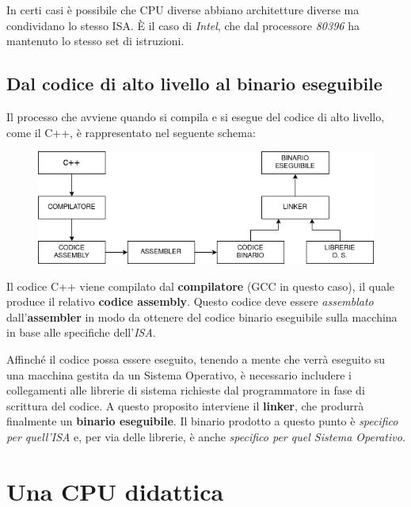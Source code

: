 \documentclass[a4paper,11pt,oneside]{book}
\begin{document}
In certi casi è possibile che CPU diverse abbiano architetture diverse ma condividano lo stesso ISA. È il caso di \emph{Intel}, che dal processore \emph{80396} ha mantenuto
lo stesso set di istruzioni.

\newpage
\subsection{Dal codice di alto livello al binario eseguibile}
Il processo che avviene quando si compila e si esegue del codice di alto livello, come il C++, è rappresentato nel seguente schema:

\begin{figure}[h]
    \centering
    \includegraphics[scale=0.5]{da_codice_a_binario}
\end{figure}
Il codice C++ viene compilato dal \textbf{compilatore} (GCC in questo caso), il quale produce il relativo \textbf{codice assembly}. Questo codice
deve essere \emph{assemblato} dall'\textbf{assembler} in modo da ottenere del codice binario eseguibile sulla macchina in base alle specifiche dell'\emph{ISA}.

Affinché il codice possa essere eseguito, tenendo a mente che verrà eseguito su una macchina gestita da un Sistema Operativo, è necessario includere i collegamenti alle
librerie di sistema richieste dal programmatore in fase di scrittura del codice. A questo proposito interviene il \textbf{linker}, che produrrà finalmente un \textbf{binario eseguibile}.
Il binario prodotto a questo punto è \emph{specifico per quell'ISA} e, per via delle librerie, è anche \emph{specifico per quel Sistema Operativo}.

\section{Una CPU didattica}
\end{document}
